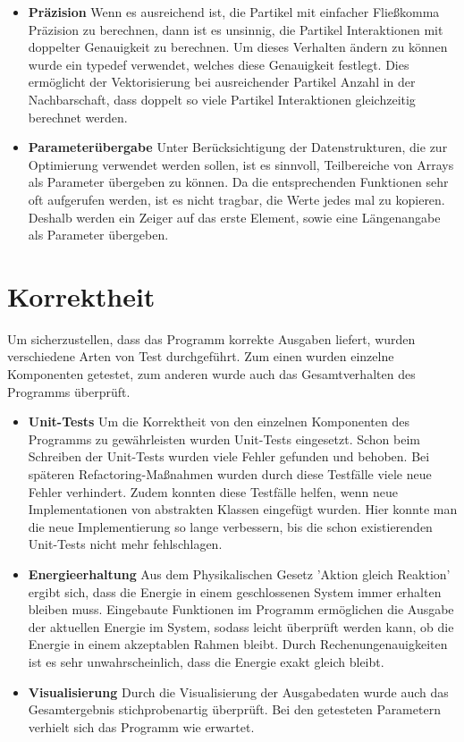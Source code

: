 \documentclass[
12pt,
a4paper,
BCOR10mm,
DIV14,
headsepline,
]{scrreprt}
\begin{document}
\begin{itemize}
		\item \textbf{Präzision} Wenn es ausreichend ist, die Partikel mit einfacher Fließkomma Präzision zu berechnen, dann ist es unsinnig, die Partikel Interaktionen mit doppelter Genauigkeit zu berechnen. Um dieses Verhalten ändern zu können wurde ein typedef verwendet, welches diese Genauigkeit festlegt. Dies ermöglicht der Vektorisierung bei ausreichender Partikel Anzahl in der Nachbarschaft, dass doppelt so viele Partikel Interaktionen gleichzeitig berechnet werden.
		\item \textbf{Parameterübergabe} Unter Berücksichtigung der Datenstrukturen, die zur Optimierung verwendet werden sollen, ist es sinnvoll, Teilbereiche von Arrays als Parameter übergeben zu können. Da die entsprechenden Funktionen sehr oft aufgerufen werden, ist es nicht tragbar, die Werte jedes mal zu kopieren. Deshalb werden ein Zeiger auf das erste Element, sowie eine Längenangabe als Parameter übergeben. 
	\end{itemize}
	\section{Korrektheit}%
	Um sicherzustellen, dass das Programm korrekte Ausgaben liefert, wurden verschiedene Arten von Test durchgeführt. Zum einen wurden einzelne Komponenten getestet, zum anderen wurde auch das Gesamtverhalten des Programms überprüft.
	\begin{itemize}
		\item \textbf{Unit-Tests} Um die Korrektheit von den einzelnen Komponenten des Programms zu gewährleisten wurden Unit-Tests eingesetzt. Schon beim Schreiben der Unit-Tests wurden viele Fehler gefunden und behoben. Bei späteren Refactoring-Maßnahmen wurden durch diese Testfälle viele neue Fehler verhindert. Zudem konnten diese Testfälle helfen, wenn neue Implementationen von abstrakten Klassen eingefügt wurden. Hier konnte man die neue Implementierung so lange verbessern, bis die schon existierenden Unit-Tests nicht mehr fehlschlagen.
		\item \textbf{Energieerhaltung} Aus dem Physikalischen Gesetz 'Aktion gleich Reaktion' ergibt sich, dass die Energie in einem geschlossenen System immer erhalten bleiben muss. Eingebaute Funktionen im Programm ermöglichen die Ausgabe der aktuellen Energie im System, sodass leicht überprüft werden kann, ob die Energie in einem akzeptablen Rahmen bleibt. Durch Rechenungenauigkeiten ist es sehr unwahrscheinlich, dass die Energie exakt gleich bleibt.
		\item \textbf{Visualisierung} Durch die Visualisierung der Ausgabedaten wurde auch das Gesamtergebnis stichprobenartig überprüft. Bei den getesteten Parametern verhielt sich das Programm wie erwartet.
	\end{itemize}
\end{document}
